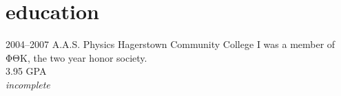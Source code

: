 \section{education}

\begin{entrylist}
  \entry
    {2004--2007}
    {A.A.S. Physics}
    {Hagerstown Community College}
    {
        I was a member of ΦΘΚ, the two year honor society.\\
        3.95 GPA\\
        \emph{incomplete}\\
    }
\end{entrylist}

